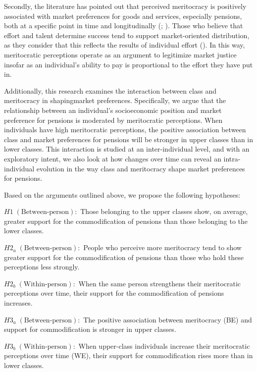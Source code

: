 \documentclass[
  12pt,
]{article}
\begin{document}
Secondly, the literature has pointed out that perceived meritocracy is
positively associated with market preferences for goods and services,
especially pensions, both at a specific point in time and longitudinally
(; ). Those who believe that effort and talent determine success
tend to support market-oriented distribution, as they consider that this
reflects the results of individual effort
(). In this way, meritocratic perceptions operate as an argument to
legitimize market justice insofar as an individual's ability to pay is
proportional to the effort they have put in.

Additionally, this research examines the interaction between class and
meritocracy in shapingmarket preferences. Specifically, we argue that
the relationship between an individual's socioeconomic position and
market preference for pensions is moderated by meritocratic perceptions.
When individuals have high meritocratic perceptions, the positive
association between class and market preferences for pensions will be
stronger in upper classes than in lower classes. This interaction is
studied at an inter-individual level, and with an exploratory intent, we
also look at how changes over time can reveal an intra-individual
evolution in the way class and meritocracy shape market preferences for
pensions.

Based on the arguments outlined above, we propose the following
hypotheses:

\(H1 \; (\text{Between-person}):\) Those belonging to the upper classes
show, on average, greater support for the commodification of pensions
than those belonging to the lower classes.

\(H2_{a} \; (\text{Between-person}):\) People who perceive more
meritocracy tend to show greater support for the commodification of
pensions than those who hold these perceptions less strongly.

\(H2_{b} \; (\text{Within-person}):\) When the same person strengthens
their meritocratic perceptions over time, their support for the
commodification of pensions increases.

\(H3_{a} \; (\text{Between-person}):\) The positive association between
meritocracy (BE) and support for commodification is stronger in upper
classes.

\(H3_{b} \; (\text{Within-person}):\) When upper-class individuals
increase their meritocratic perceptions over time (WE), their support
for commodification rises more than in lower classes.
\end{document}
